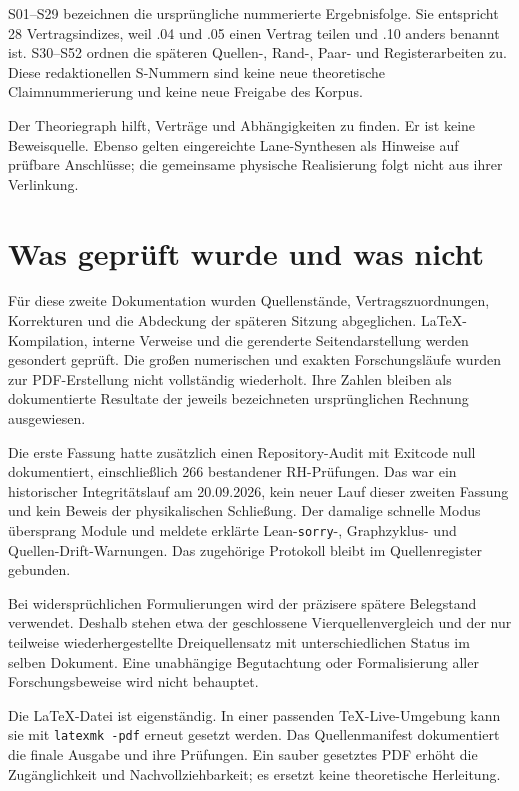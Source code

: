 S01--S29 bezeichnen die ursprüngliche nummerierte Ergebnisfolge. Sie entspricht 28 Vertragsindizes, weil .04 und .05 einen Vertrag teilen und .10 anders benannt ist. S30--S52 ordnen die späteren Quellen-, Rand-, Paar- und Registerarbeiten zu. Diese redaktionellen S-Nummern sind keine neue theoretische Claimnummerierung und keine neue Freigabe des Korpus.

Der Theoriegraph hilft, Verträge und Abhängigkeiten zu finden. Er ist keine Beweisquelle. Ebenso gelten eingereichte Lane-Synthesen als Hinweise auf prüfbare Anschlüsse; die gemeinsame physische Realisierung folgt nicht aus ihrer Verlinkung.

\section{Was geprüft wurde und was nicht}
Für diese zweite Dokumentation wurden Quellenstände, Vertragszuordnungen, Korrekturen und die Abdeckung der späteren Sitzung abgeglichen. LaTeX-Kompilation, interne Verweise und die gerenderte Seitendarstellung werden gesondert geprüft. Die großen numerischen und exakten Forschungsläufe wurden zur PDF-Erstellung nicht vollständig wiederholt. Ihre Zahlen bleiben als dokumentierte Resultate der jeweils bezeichneten ursprünglichen Rechnung ausgewiesen.

Die erste Fassung hatte zusätzlich einen Repository-Audit mit Exitcode null dokumentiert, einschließlich 266 bestandener RH-Prüfungen. Das war ein historischer Integritätslauf am 20.09.2026, kein neuer Lauf dieser zweiten Fassung und kein Beweis der physikalischen Schließung. Der damalige schnelle Modus übersprang Module und meldete erklärte Lean-\texttt{sorry}-, Graphzyklus- und Quellen-Drift-Warnungen. Das zugehörige Protokoll bleibt im Quellenregister gebunden.

Bei widersprüchlichen Formulierungen wird der präzisere spätere Belegstand verwendet. Deshalb stehen etwa der geschlossene Vierquellenvergleich und der nur teilweise wiederhergestellte Dreiquellensatz mit unterschiedlichen Status im selben Dokument. Eine unabhängige Begutachtung oder Formalisierung aller Forschungsbeweise wird nicht behauptet.

Die LaTeX-Datei ist eigenständig. In einer passenden TeX-Live-Umgebung kann sie mit \texttt{latexmk -pdf} erneut gesetzt werden. Das Quellenmanifest dokumentiert die finale Ausgabe und ihre Prüfungen. Ein sauber gesetztes PDF erhöht die Zugänglichkeit und Nachvollziehbarkeit; es ersetzt keine theoretische Herleitung.

